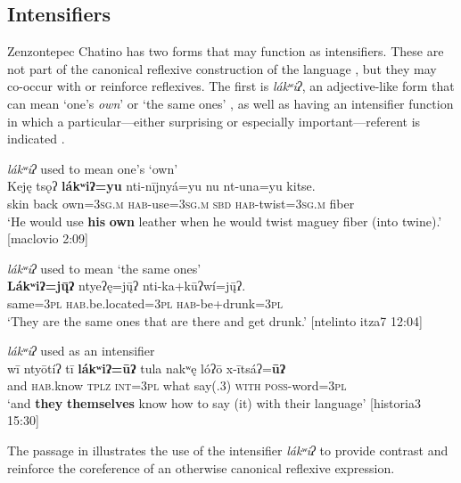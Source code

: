 \documentclass[output=paper]{../langscibook}
\begin{document}
\subsection{Intensifiers}
\label{sec:campbell:5.3}

Zenzontepec Chatino has two forms that may function as intensifiers. These are not part of the canonical reflexive construction of the language , but they may co-occur with or reinforce reflexives. The first is \textit{lákʷiʔ}, an adjective-like form that can mean ‘one’s \textit{own}’ or ‘the same ones’ , as well as having an intensifier function in which a particular—either surprising or especially important—referent is indicated .


\ea\label{ex:campbell:45}
{\textit{lákʷiʔ} used to mean one’s ‘own’}\\
\gll Keję  tsǫʔ  \textbf{lákʷiʔ=yu}  nti-nījnyá=yu  nu  nt-una=yu  kitse.\\
     skin  back  own=\textsc{3sg.m}  \textsc{hab-}use=\textsc{3sg.m}  \textsc{sbd}  \textsc{hab-}twist=3\textsc{sg.m}  fiber\\
\glt ‘He would use \textbf{his} \textbf{own} leather when he would twist maguey fiber (into twine).’ [maclovio 2:09]
\z

\ea\label{ex:campbell:46}
{\textit{lákʷiʔ} used to mean ‘the same ones’}\\
\gll \textbf{Lákʷiʔ=j\={\k{u}}ʔ}  ntyeʔę=j\={\k{u}}ʔ  nti-ka+kūʔwí=j\={\k{u}}ʔ.\\
     same=3\textsc{pl}  \textsc{hab}.be.located=3\textsc{pl}  \textsc{hab-}be+drunk=3\textsc{pl}\\
\glt ‘They are the same ones that are there and get drunk.’ [ntelinto itza7 12:04]
\z

\ea\label{ex:campbell:47}
{\textit{lákʷiʔ} used as an intensifier}\\
\gll wī  ntyōtíʔ  tī  \textbf{lákʷiʔ=ūʔ}  tula  nakʷę  lóʔō  x-ītsáʔ=\textbf{ūʔ}\\
     and  \textsc{hab}.know  \textsc{tplz}  \textsc{int=3pl}  what  say(.3)  \textsc{with}  \textsc{poss-}word=\textsc{3pl}\\
\glt ‘and \textbf{they} \textbf{themselves} know how to say (it) with their language’ [historia3 15:30]
\z


The passage in  illustrates the use of the intensifier \textit{lákʷiʔ} to provide contrast and reinforce the coreference of an otherwise canonical reflexive expression.
\end{document}
